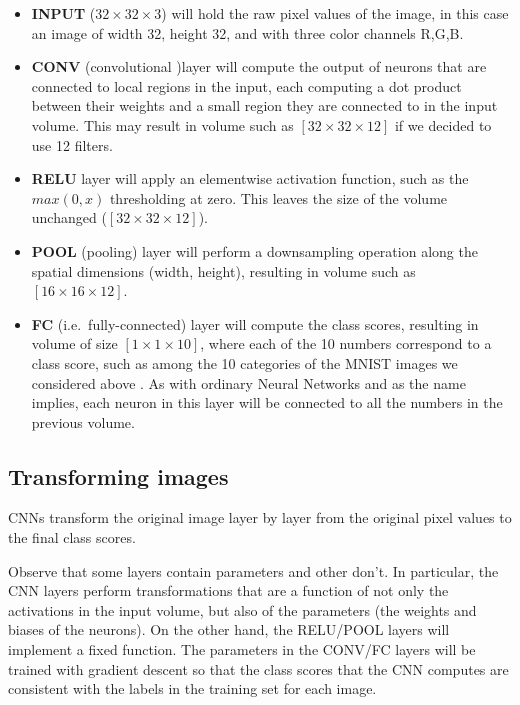 \documentclass[%
oneside,                 %
final,                   %
10pt]{article}
\begin{document}
\begin{itemize}
\item \textbf{INPUT} ($32\times 32 \times 3$) will hold the raw pixel values of the image, in this case an image of width 32, height 32, and with three color channels R,G,B.

\item \textbf{CONV} (convolutional )layer will compute the output of neurons that are connected to local regions in the input, each computing a dot product between their weights and a small region they are connected to in the input volume. This may result in volume such as $[32\times 32\times 12]$ if we decided to use 12 filters.

\item \textbf{RELU} layer will apply an elementwise activation function, such as the $max(0,x)$ thresholding at zero. This leaves the size of the volume unchanged ($[32\times 32\times 12]$).

\item \textbf{POOL} (pooling) layer will perform a downsampling operation along the spatial dimensions (width, height), resulting in volume such as $[16\times 16\times 12]$.

\item \textbf{FC} (i.e.~fully-connected) layer will compute the class scores, resulting in volume of size $[1\times 1\times 10]$, where each of the 10 numbers correspond to a class score, such as among the 10 categories of the MNIST images we considered above . As with ordinary Neural Networks and as the name implies, each neuron in this layer will be connected to all the numbers in the previous volume.
\end{itemize}

\noindent
\subsection*{Transforming images}

CNNs transform the original image layer by layer from the original
pixel values to the final class scores. 

Observe that some layers contain
parameters and other don’t. In particular, the CNN layers perform
transformations that are a function of not only the activations in the
input volume, but also of the parameters (the weights and biases of
the neurons). On the other hand, the RELU/POOL layers will implement a
fixed function. The parameters in the CONV/FC layers will be trained
with gradient descent so that the class scores that the CNN computes
are consistent with the labels in the training set for each image.
\end{document}
